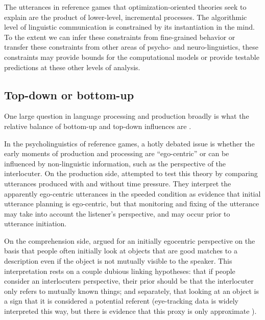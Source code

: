 \documentclass[]{article}
\begin{document}
The utterances in reference games that optimization-oriented theories seek to explain are the product of lower-level, incremental processes. The algorithmic level of linguistic communication is constrained by its instantiation in the mind. To the extent we can infer these constraints from fine-grained behavior or transfer these constraints from other areas of psycho- and neuro-linguistics, these constraints may provide bounds for the computational models or provide testable predictions at these other levels of analysis. 





\subsection{Top-down or bottom-up}
One large question in language processing and production broadly is what the relative balance of bottom-up and top-down influences are \citep{gwilliams2022,tanenhaus1995,horton2005, horton1996}. 

In the psycholinguistics of reference games, a hotly debated issue is whether the early moments of production and processing are ``ego-centric'' or can be influenced by non-linguistic information, such as the perspective of the interlocuter. On the production side, \citet{horton1996} attempted to test this theory by comparing utterances produced with and without time pressure. They interpret the apparently ego-centric utterances in the speeded condition as evidence that initial utterance planning is ego-centric, but that monitoring and fixing of the utterance may take into account the listener's perspective, and may occur prior to utterance initiation. 

On the comprehension side, \citet{keysar2000} argued for an initially egocentric perspective on the basis that people often initially look at objects that are good matches to a description even if the object is not mutually visible to the speaker. This interpretation rests on a couple dubious linking hypotheses: that if people consider an interlocuters perspective, their prior should be that the interlocuter only refers to mutually known things;  and separately, that looking at an object is a sign that it is considered a potential referent (eye-tracking data is widely interpreted this way, but there is evidence that this proxy is only approximate \citep{degena}).
\end{document}
